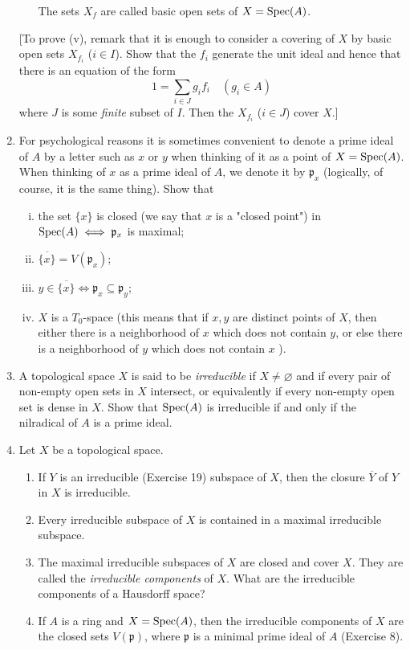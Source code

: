 \documentclass[class=book, crop=false]{standalone}
\theoremstyle{definition}
\theoremstyle{remark}
\begin{document}
\begin{enumerate}[resume*=exc1]
\begin{enumerate}[i)]
The sets $X_{f}$ are called basic open sets of $X=\operatorname{Spec}(A)$.
\end{enumerate}
[To prove (v), remark that it is enough to consider a covering of $X$ by basic
open sets $X_{f_{i}}$ ($i \in I$). Show that the $f_{i}$ generate the unit ideal
and hence that there is an equation of the form
\[
  1=\sum_{i \in J} g_{i} f_{i} \quad\left(g_{i} \in A\right)
\]
where $J$ is some \textit{finite} subset of $I$. Then the $X_{f_{i}}$ ($i \in J$) cover
$X$.]

\item For psychological reasons it is sometimes convenient to denote a prime
ideal of $A$ by a letter such as $x$ or $y$ when thinking of it as a point of
$X=\operatorname{Spec}(A)$. When thinking of $x$ as a prime ideal of $A$, we
denote it by $\mathfrak{p}_{x}$ (logically, of course, it is the same thing).
Show that
\begin{enumerate}[i)]
  \item the set $\{x\}$ is closed (we say that $x$ is a "closed point") in
$\operatorname{Spec}(A) \iff \mathfrak{p}_{x}$ is maximal;
  \item $\overline{\{x\}}=V\left(\mathfrak{p}_{x}\right)$;
  \item $y \in \overline{\{x\}} \iff \mathfrak{p}_{x} \subseteq \mathfrak{p}_{y}$;
  \item $X$ is a $T_{0}$-space (this means that if $x, y$ are distinct points of
$X$, then either there is a neighborhood of $x$ which does not contain $y$, or
else there is a neighborhood of $y$ which does not contain $x$ ).
\end{enumerate}
  \item A topological space $X$ is said to be \textit{irreducible} if
        $X \neq \varnothing$ and if every pair of non-empty open sets in $X$
        intersect, or equivalently if every non-empty open set is dense in $X$.
        Show that $\operatorname{Spec}(A)$ is irreducible if and only if the
        nilradical of $A$ is a prime ideal.

  \item Let $X$ be a topological space.
\begin{enumerate}
  \item If $Y$ is an irreducible (Exercise 19) subspace of $X$, then the closure
$\overline{Y}$ of $Y$ in $X$ is irreducible.
  \item Every irreducible subspace of $X$ is contained in a maximal irreducible
subspace.
  \item The maximal irreducible subspaces of $X$ are closed and cover $X$. They are
called the \textit{irreducible components} of $X$. What are the irreducible components of
a Hausdorff space?
  \item If $A$ is a ring and $X=\operatorname{Spec}(A)$, then the irreducible
components of $X$ are the closed sets $V(\mathfrak{p})$, where $\mathfrak{p}$ is
a minimal prime ideal of $A$ (Exercise 8).
\end{enumerate}


\end{enumerate}
\end{document}
